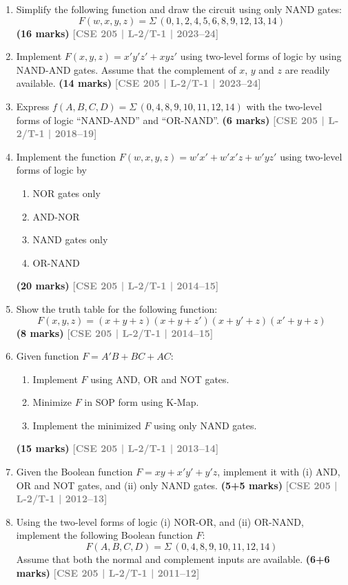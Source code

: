 \documentclass[12pt]{article}
\newcommand{\yr}[1]{\hfill\textcolor{gray}{\small\textbf{[#1]}}}
\newcommand{\mk}[1]{\textcolor{orange!70!black}{\small\textbf{(#1 marks)}}}
\begin{document}
\begin{enumerate}

\item Simplify the following function and draw the circuit using only NAND gates:
\[ F(w,x,y,z) = \Sigma\,(0,1,2,4,5,6,8,9,12,13,14) \]
\mk{16} \yr{CSE 205 | L-2/T-1 | 2023--24}






\item Implement $F(x,y,z) = x'y'z' + xyz'$ using two-level forms of logic by using NAND-AND gates. Assume that the complement of $x$, $y$ and $z$ are readily available.
\mk{14} \yr{CSE 205 | L-2/T-1 | 2023--24}



\item Express $f(A,B,C,D) = \Sigma\,(0,4,8,9,10,11,12,14)$ with the two-level forms of logic ``NAND-AND'' and ``OR-NAND''.
\mk{6} \yr{CSE 205 | L-2/T-1 | 2018--19}



\item Implement the function $F(w, x, y, z) = w'x' + w'x'z + w'yz'$ using two-level forms of logic by
\begin{enumerate}
  \item NOR gates only
  \item AND-NOR
  \item NAND gates only
  \item OR-NAND
\end{enumerate}
\mk{20} \yr{CSE 205 | L-2/T-1 | 2014--15}



\item Show the truth table for the following function:
\[ F(x, y, z) = (x+y+z)(x+y+z')(x+y'+z)(x'+y+z) \]
\mk{8} \yr{CSE 205 | L-2/T-1 | 2014--15}



\item Given function $F = A'B + BC + AC$:
\begin{enumerate}
  \item Implement $F$ using AND, OR and NOT gates.
  \item Minimize $F$ in SOP form using K-Map.
  \item Implement the minimized $F$ using only NAND gates.

\end{enumerate}
\mk{15} \yr{CSE 205 | L-2/T-1 | 2013--14}



\item Given the Boolean function $F = xy + x'y' + y'z$, implement it with (i) AND, OR and NOT gates, and (ii) only NAND gates.
\mk{5+5} \yr{CSE 205 | L-2/T-1 | 2012--13}



\item Using the two-level forms of logic (i) NOR-OR, and (ii) OR-NAND, implement the following Boolean function $F$:
\[ F(A,B,C,D) = \Sigma\,(0,4,8,9,10,11,12,14) \]
Assume that both the normal and complement inputs are available.
\mk{6+6} \yr{CSE 205 | L-2/T-1 | 2011--12}



\end{enumerate}
\end{document}
